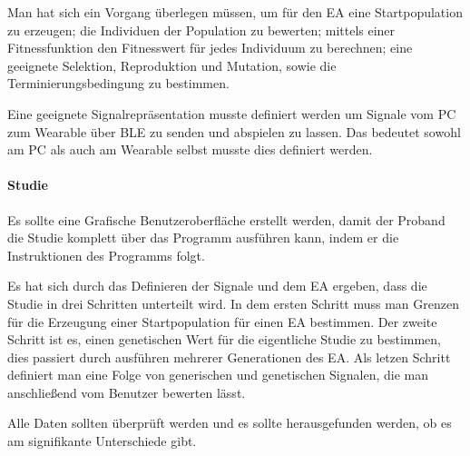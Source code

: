 Man hat sich ein Vorgang {\"u}berlegen m{\"u}ssen, um f{\"u}r den EA eine Startpopulation zu erzeugen; die Individuen der Population zu bewerten; mittels einer Fitnessfunktion den Fitnesswert f{\"u}r jedes Individuum zu berechnen; eine geeignete Selektion, Reproduktion und Mutation, sowie die Terminierungsbedingung zu bestimmen. 

Eine geeignete Signalrepr{\"a}sentation musste definiert werden um Signale vom PC zum Wearable {\"u}ber BLE zu senden und abspielen zu lassen. Das bedeutet sowohl am PC als auch am Wearable selbst musste dies definiert werden.

\paragraph{Studie}

Es sollte eine Grafische Benutzeroberfl{\"a}che erstellt werden, damit der Proband die Studie komplett {\"u}ber das Programm ausf{\"u}hren kann, indem er die Instruktionen des Programms folgt.

Es hat sich durch das Definieren der Signale und dem EA ergeben, dass die Studie in drei Schritten unterteilt wird. 
In dem ersten Schritt muss man Grenzen f{\"u}r die Erzeugung einer Startpopulation f{\"u}r einen EA bestimmen.
Der zweite Schritt ist es, einen genetischen Wert f{\"u}r die eigentliche Studie zu bestimmen, dies passiert durch ausf{\"u}hren mehrerer Generationen des EA. 
Als letzen Schritt definiert man eine Folge von generischen und genetischen Signalen, die man anschlie{\ss}end vom Benutzer bewerten l{\"a}sst.

Alle Daten sollten {\"u}berpr{\"u}ft werden und es sollte herausgefunden werden, ob es am signifikante Unterschiede gibt.




